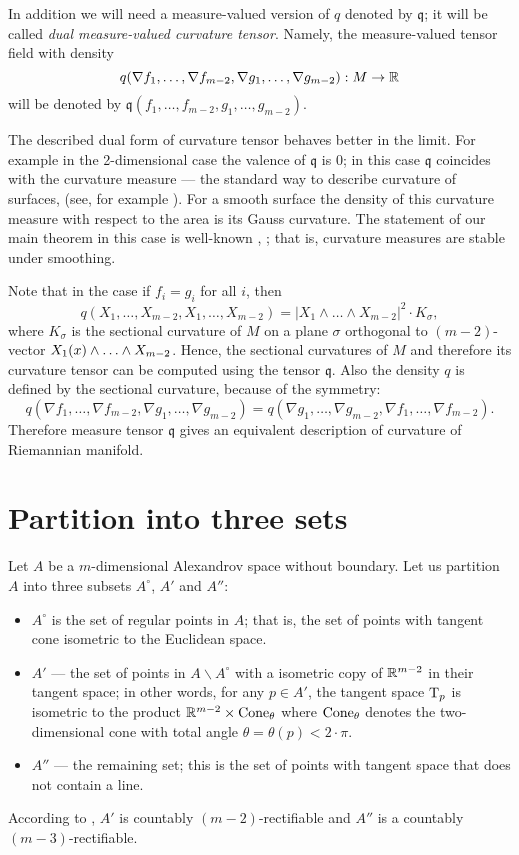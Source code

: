 In addition we will need a measure-valued version of $q$ denoted by $\mathfrak{q}$;
it will be called \emph{dual measure-valued curvature tensor}.
Namely, the measure-valued tensor field with density
\[q(\nabla f_1,\dots,\nabla f_{m-2},\nabla g_1,\dots,\nabla g_{m-2}): M\to\mathbb{R}\]
will be denoted by $\mathfrak{q}(f_1,\dots,f_{m-2},g_1,\dots,g_{m-2})$.


The described dual form of curvature tensor behaves better in the limit.
For example in the 2-dimensional case the valence of $\mathfrak{q}$ is $0$;
in this case $\mathfrak{q}$ coincides with the curvature measure --- the standard way to describe curvature of surfaces, 
(see, for example \cite{R}).
For a smooth surface the density of this curvature measure with respect to the area
is its Gauss curvature.
The statement of our main theorem in this case
is well-known \cite[Theorem 8.4.2]{R}, \cite{AZ};
that is, curvature measures are stable under smoothing.


Note that in the case if $f_i=g_i$ for all $i$, then 
$$q(X_1,\dots,X_{m-2},X_1,\dots,X_{m-2})
=
|X_1\wedge\dots \wedge X_{m-2}|^2\cdot K_\sigma, $$
where $K_\sigma$ is the sectional curvature of $M$ 
on a plane $\sigma$ orthogonal to $(m-2)$-vector
$X_1(x)\wedge\zz\dots \wedge X_{m-2}$.
Hence, the sectional curvatures of $M$ and therefore its curvature tensor can  be computed using the tensor
$\mathfrak{q}$.
Also the density $q$ is defined by the sectional curvature,
because of the symmetry:
$${q}(\nabla f_1,\dots,\nabla f_{m-2},\nabla g_1,\dots,\nabla g_{m-2})=
{q}(\nabla g_1,\dots,\nabla g_{m-2},\nabla f_1,\dots,\nabla f_{m-2}).$$
Therefore measure tensor $\mathfrak{q}$
gives an equivalent description of curvature of Riemannian manifold.


\section{Partition into three sets}

Let $A$ be a $m$-dimensional Alexandrov space without boundary. 
Let us partition $A$ into three subsets $A^\circ$, $A'$ and $A''$:
\begin{itemize}
\item $A^\circ$ is the set of regular points in $A$; that is, the set of points with tangent cone isometric to the Euclidean space.
\item $A'$ --- the set of points in $A\backslash A^\circ$ with a isometric copy of $\mathbb{R}^{m-2}$ in their tangent space;
in other words, for any $p\in A'$, the tangent space $\mathrm{T}_p$ is isometric to the product $\mathbb{R}^{m-2}\times \operatorname{Cone}_\theta$ where $\operatorname{Cone}_\theta$ denotes the two-dimensional cone with total angle $\theta=\theta(p)<2\cdot \pi$.
\item $A''$ --- the remaining set; this is the set of points with tangent space that does not contain a line.
\end{itemize}
According to \cite{li-naber}, $A'$ is countably $(m-2)$-rectifiable and $A''$ is a countably $(m-3)$-rectifiable. 

